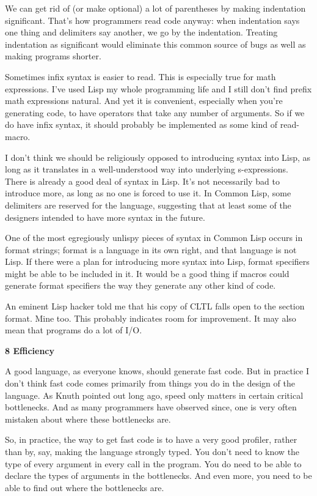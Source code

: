 We can get rid of (or make optional) a lot of parentheses by making
indentation significant. That's how programmers read code anyway: when
indentation says one thing and delimiters say another, we go by the
indentation. Treating indentation as significant would eliminate this
common source of bugs as well as making programs shorter.

Sometimes infix syntax is easier to read. This is especially true for
math expressions. I've used Lisp my whole programming life and I still
don't find prefix math expressions natural. And yet it is convenient,
especially when you're generating code, to have operators that take any
number of arguments. So if we do have infix syntax, it should probably
be implemented as some kind of read-macro.

I don't think we should be religiously opposed to introducing syntax
into Lisp, as long as it translates in a well-understood way into
underlying s-expressions. There is already a good deal of syntax in
Lisp. It's not necessarily bad to introduce more, as long as no one is
forced to use it. In Common Lisp, some delimiters are reserved for the
language, suggesting that at least some of the designers intended to
have more syntax in the future.

One of the most egregiously unlispy pieces of syntax in Common Lisp
occurs in format strings; format is a language in its own right, and
that language is not Lisp. If there were a plan for introducing more
syntax into Lisp, format specifiers might be able to be included in it.
It would be a good thing if macros could generate format specifiers the
way they generate any other kind of code.

An eminent Lisp hacker told me that his copy of CLTL falls open to the
section format. Mine too. This probably indicates room for improvement.
It may also mean that programs do a lot of I/O.

\textbf{8 Efficiency}

A good language, as everyone knows, should generate fast code. But in
practice I don't think fast code comes primarily from things you do in
the design of the language. As Knuth pointed out long ago, speed only
matters in certain critical bottlenecks. And as many programmers have
observed since, one is very often mistaken about where these bottlenecks
are.

So, in practice, the way to get fast code is to have a very good
profiler, rather than by, say, making the language strongly typed. You
don't need to know the type of every argument in every call in the
program. You do need to be able to declare the types of arguments in the
bottlenecks. And even more, you need to be able to find out where the
bottlenecks are.


